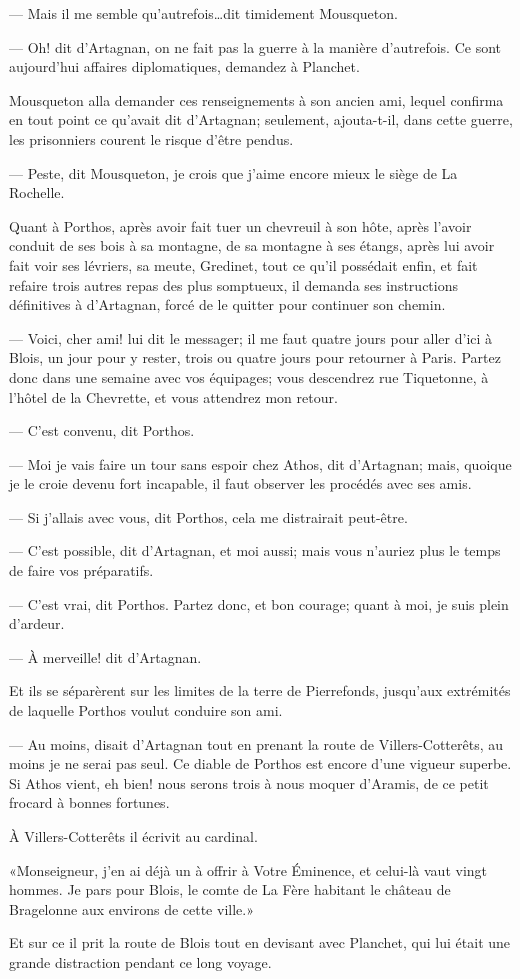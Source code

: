 — Mais il me semble qu'autrefois\dots dit timidement Mousqueton.

— Oh! dit d'Artagnan, on ne fait pas la guerre à la manière d'autrefois. Ce sont aujourd'hui affaires diplomatiques, demandez à Planchet.

Mousqueton alla demander ces renseignements à son ancien ami, lequel confirma en tout point ce qu'avait dit d'Artagnan; seulement, ajouta-t-il, dans cette guerre, les prisonniers courent le risque d'être pendus.

— Peste, dit Mousqueton, je crois que j'aime encore mieux le siège de La Rochelle.

Quant à Porthos, après avoir fait tuer un chevreuil à son hôte, après l'avoir conduit de ses bois à sa montagne, de sa montagne à ses étangs, après lui avoir fait voir ses lévriers, sa meute, Gredinet, tout ce qu'il possédait enfin, et fait refaire trois autres repas des plus somptueux, il demanda ses instructions définitives à d'Artagnan, forcé de le quitter pour continuer son chemin.

— Voici, cher ami! lui dit le messager; il me faut quatre jours pour aller d'ici à Blois, un jour pour y rester, trois ou quatre jours pour retourner à Paris. Partez donc dans une semaine avec vos équipages; vous descendrez rue Tiquetonne, à l'hôtel de la Chevrette, et vous attendrez mon retour.

— C'est convenu, dit Porthos.

— Moi je vais faire un tour sans espoir chez Athos, dit d'Artagnan; mais, quoique je le croie devenu fort incapable, il faut observer les procédés avec ses amis.

— Si j'allais avec vous, dit Porthos, cela me distrairait peut-être.

— C'est possible, dit d'Artagnan, et moi aussi; mais vous n'auriez plus le temps de faire vos préparatifs.

— C'est vrai, dit Porthos. Partez donc, et bon courage; quant à moi, je suis plein d'ardeur.

— À merveille! dit d'Artagnan.

Et ils se séparèrent sur les limites de la terre de Pierrefonds, jusqu'aux extrémités de laquelle Porthos voulut conduire son ami.

— Au moins, disait d'Artagnan tout en prenant la route de Villers-Cotterêts, au moins je ne serai pas seul. Ce diable de Porthos est encore d'une vigueur superbe. Si Athos vient, eh bien! nous serons trois à nous moquer d'Aramis, de ce petit frocard à bonnes fortunes.

À Villers-Cotterêts il écrivit au cardinal.

«Monseigneur, j'en ai déjà un à offrir à Votre Éminence, et celui-là vaut vingt hommes. Je pars pour Blois, le comte de La Fère habitant le château de Bragelonne aux environs de cette ville.»

Et sur ce il prit la route de Blois tout en devisant avec Planchet, qui lui était une grande distraction pendant ce long voyage.